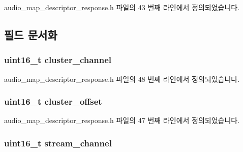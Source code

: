 audio\+\_\+map\+\_\+descriptor\+\_\+response.\+h 파일의 43 번째 라인에서 정의되었습니다.



\subsection{필드 문서화}
\subsubsection[{\texorpdfstring{cluster\+\_\+channel}{cluster_channel}}]{\setlength{\rightskip}{0pt plus 5cm}uint16\+\_\+t cluster\+\_\+channel}\hypertarget{structavdecc__lib_1_1audio__map__mapping_ad7ad28dde5b77668bff26372dab9ea76}{}\label{structavdecc__lib_1_1audio__map__mapping_ad7ad28dde5b77668bff26372dab9ea76}


audio\+\_\+map\+\_\+descriptor\+\_\+response.\+h 파일의 48 번째 라인에서 정의되었습니다.

\subsubsection[{\texorpdfstring{cluster\+\_\+offset}{cluster_offset}}]{\setlength{\rightskip}{0pt plus 5cm}uint16\+\_\+t cluster\+\_\+offset}\hypertarget{structavdecc__lib_1_1audio__map__mapping_ad255a47e83b1a3056865a81c5f3a2545}{}\label{structavdecc__lib_1_1audio__map__mapping_ad255a47e83b1a3056865a81c5f3a2545}


audio\+\_\+map\+\_\+descriptor\+\_\+response.\+h 파일의 47 번째 라인에서 정의되었습니다.

\subsubsection[{\texorpdfstring{stream\+\_\+channel}{stream_channel}}]{\setlength{\rightskip}{0pt plus 5cm}uint16\+\_\+t stream\+\_\+channel}\hypertarget{structavdecc__lib_1_1audio__map__mapping_a99de82258f8163098a8ff558abf07af7}{}\label{structavdecc__lib_1_1audio__map__mapping_a99de82258f8163098a8ff558abf07af7}


